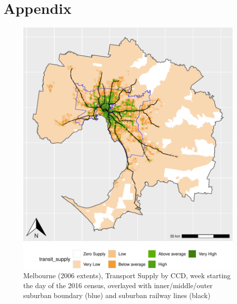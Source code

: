 \documentclass[preprint, 3p,
authoryear]{elsarticle} %
\begin{document}
\section{Appendix}\label{appendix}

\begin{figure}
\centering
\includegraphics{Leveraging_GTFS_to_assess_transit_supply_Transport_Geography_files/figure-latex/Greater_Melbourne_CCD_2016_appendix-1.pdf}
\caption{Melbourne (2006 extents), Transport Supply by CCD, week
starting the day of the 2016 census, overlayed with inner/middle/outer
suburban boundary (blue) and suburban railway lines (black)}
\end{figure}
\end{document}
